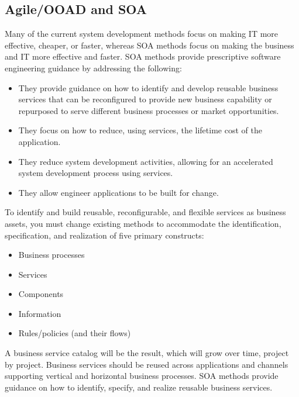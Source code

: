 \documentclass[12pt,a4paper,final,twoside,onecolumn,titlepage]{book}
\begin{document}
\subsection{Agile/OOAD and SOA}
Many of the current system development methods focus on making IT more effective, cheaper, or faster, whereas \gls{SOA} methods focus on making the business and IT more effective and faster. \gls{SOA} methods provide prescriptive software engineering guidance by addressing the following:
\begin{itemize}
\item They provide guidance on how to identify and develop reusable business services that can be reconfigured to provide new business capability or repurposed to serve different business processes or market opportunities.
\item They focus on how to reduce, using services, the lifetime cost of the application.
\item They reduce system development activities, allowing for an accelerated system development process using services.
\item They allow engineer applications to be built for change.
\end{itemize}
To identify and build reusable, reconfigurable, and flexible services as business assets, you must change existing methods to accommodate the identification, specification, and realization of five primary constructs:
\begin{itemize}
\item Business processes 
\item Services
\item Components
\item Information
\item Rules/policies (and their flows)
\end{itemize}
A business service catalog will be the result, which will grow over time, project by project. Business services should be reused across applications and channels supporting vertical and horizontal business processes. \gls{SOA} methods provide guidance on how to identify, specify, and realize reusable business services.
\end{document}
